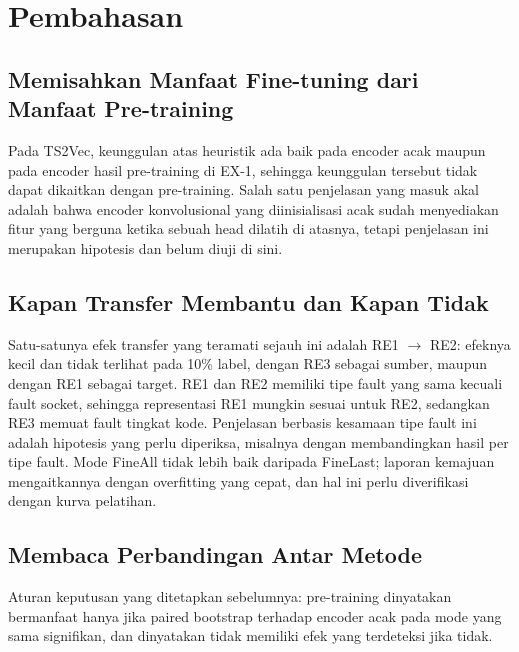 \section{Pembahasan}\label{sec:discussion}
\subsection{Memisahkan Manfaat Fine-tuning dari Manfaat Pre-training}
Pada TS2Vec, keunggulan atas heuristik ada baik pada encoder acak maupun pada encoder hasil pre-training di EX-1, sehingga keunggulan tersebut tidak dapat dikaitkan dengan pre-training. Salah satu penjelasan yang masuk akal adalah bahwa encoder konvolusional yang diinisialisasi acak sudah menyediakan fitur yang berguna ketika sebuah head dilatih di atasnya, tetapi penjelasan ini merupakan hipotesis dan belum diuji di sini. 

\subsection{Kapan Transfer Membantu dan Kapan Tidak}
Satu-satunya efek transfer yang teramati sejauh ini adalah RE1 $\rightarrow$ RE2: efeknya kecil dan tidak terlihat pada 10\% label, dengan RE3 sebagai sumber, maupun dengan RE1 sebagai target. RE1 dan RE2 memiliki tipe fault yang sama kecuali fault socket, sehingga representasi RE1 mungkin sesuai untuk RE2, sedangkan RE3 memuat fault tingkat kode. Penjelasan berbasis kesamaan tipe fault ini adalah hipotesis yang perlu diperiksa, misalnya dengan membandingkan hasil per tipe fault.  Mode FineAll tidak lebih baik daripada FineLast; laporan kemajuan mengaitkannya dengan overfitting yang cepat, dan hal ini perlu diverifikasi dengan kurva pelatihan.

\subsection{Membaca Perbandingan Antar Metode}
Aturan keputusan yang ditetapkan sebelumnya: pre-training dinyatakan bermanfaat hanya jika paired bootstrap terhadap encoder acak pada mode yang sama signifikan, dan dinyatakan tidak memiliki efek yang terdeteksi jika tidak.

